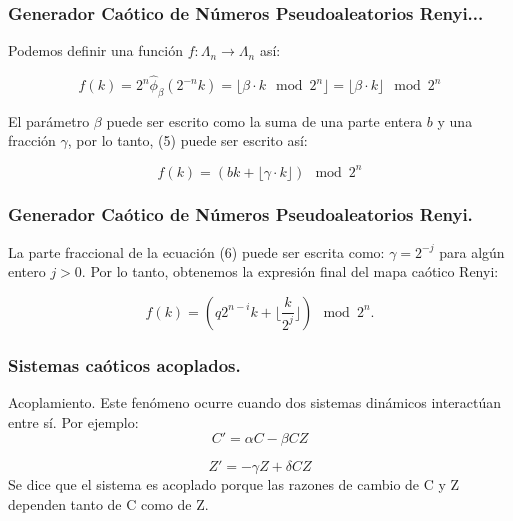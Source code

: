 \documentclass[xcolor=table]{beamer}
\begin{document}
\begin{frame}
\frametitle{Generador Caótico de Números Pseudoaleatorios Renyi...}

Podemos definir una función $f: \Lambda_{n} \longrightarrow  \Lambda_{n} $ así:

\begin{equation}
f(k)= 2^{n}  \hat{\phi} _{\beta}(2^{-n}k)=  \lfloor \beta \cdot k \mod 2^{n}  \rfloor =
\lfloor  \beta \cdot k \rfloor \mod 2^{n}
\end{equation}


El parámetro $\beta$ puede ser escrito como la suma de una parte entera $b$ y una fracción $\gamma$, por lo tanto, (5) puede ser escrito así:

\begin{equation}
f(k)= (bk + \lfloor \gamma \cdot k \rfloor) \mod 2^{n}
\end{equation}
\end{frame}


\begin{frame}
\frametitle{Generador Caótico de Números Pseudoaleatorios Renyi.}

La parte fraccional de la ecuación (6) puede ser escrita como: $\gamma = 2^{-j}$ para algún entero $j>0$. Por lo tanto, obtenemos la expresión final del mapa caótico Renyi:

\begin{equation}
f(k)=  \left( q 2^{n-i}k+  \lfloor\frac{k}{2^{j}} \rfloor   \right) \mod 2^{n}.
\end{equation}
\end{frame}





\begin{frame}
\frametitle{Sistemas caóticos acoplados.}
\begin{block}{Acoplamiento.}
Este fenómeno ocurre cuando dos sistemas dinámicos interactúan entre sí. Por ejemplo:
\begin{equation}
C' =  \alpha C - \beta CZ
\end{equation}

\begin{equation}
Z' = - \gamma Z + \delta CZ
\end{equation}
Se dice que el sistema es acoplado porque las razones de cambio de C y Z dependen tanto de C como de Z. 
\end{block}


\end{frame}
\end{document}

